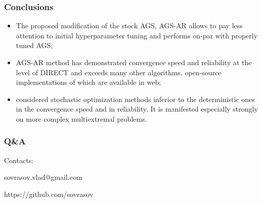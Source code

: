 \documentclass[aspectratio=1610]{beamer}
\newcommand\unnumbered{\setbeamertemplate{footline}{}}
\begin{document}
\begin{frame}
  \frametitle{Conclusions}
    \begin{itemize}
      \item The proposed modification of the stock AGS, AGS-AR allows to pay less attention to initial hyperparameter tuning and
      performs on-par with properly tuned AGS;
      \item AGS-AR method has demonstrated convergence
      speed and reliability at the level of DIRECT and exceeds many other algorithms, open-source
      implementations of which are available in web;
      \item considered stochastic optimization methods inferior to the deterministic ones in the convergence
    speed and in reliability. It is manifested especially strongly on more complex multiextremal
    problems.
    \end{itemize}
\end{frame}

{
\unnumbered
\begin{frame}{{}}
  \frametitle{Q\&A}
  \begin{center}
    \Large{Contacts:}
\vspace{0.5cm}

    sovrasov.vlad@gmail.com

    https://github.com/sovrasov
  \end{center}
\end{frame}
}
\end{document}
